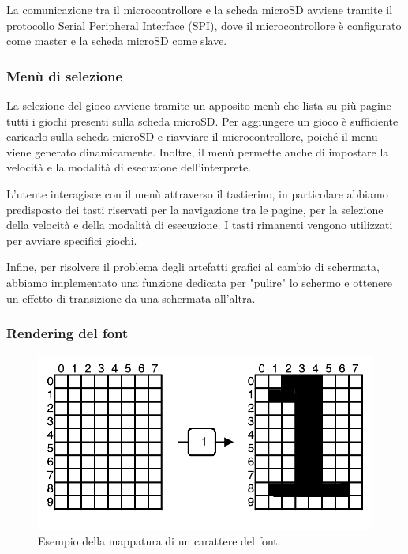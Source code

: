 \documentclass[a4paper]{article}
\begin{document}
La comunicazione tra il microcontrollore e la scheda microSD avviene tramite il protocollo
Serial Peripheral Interface (SPI), dove il microcontrollore è configurato come
master e la scheda microSD come slave.

\subsubsection{Menù di selezione}

La selezione del gioco avviene tramite un apposito menù che lista su più pagine tutti i giochi
presenti sulla scheda microSD. Per aggiungere un gioco è sufficiente caricarlo sulla scheda
microSD e riavviare il microcontrollore, poiché il menu viene generato dinamicamente.
Inoltre, il menù permette anche di impostare la velocità e la modalità di esecuzione
dell'interprete.

L'utente interagisce con il menù attraverso il tastierino, in particolare abbiamo predisposto
dei tasti riservati per la navigazione tra le pagine, per la selezione della velocità e
della modalità di esecuzione. I tasti rimanenti vengono utilizzati per avviare specifici giochi.

Infine, per risolvere il problema degli artefatti grafici al cambio di schermata,
abbiamo implementato una funzione dedicata per "pulire" lo schermo e ottenere un effetto
di transizione da una schermata all'altra.

\subsubsection{Rendering del font}

\begin{figure}[h!t]
    \begin{center}
        \includegraphics[scale=0.5]{./figures/matrix_font.pdf}
    \end{center}
    \caption{Esempio della mappatura di un carattere del font.}
    \label{fig:matrix_font}
\end{figure}
\end{document}
